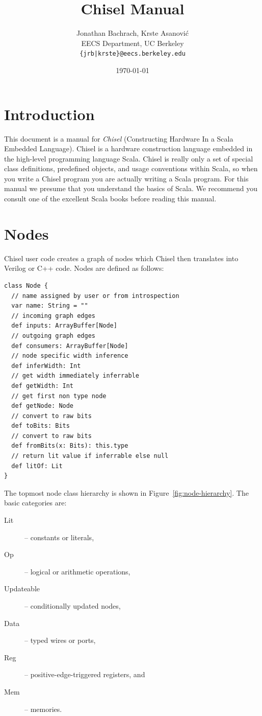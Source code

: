 \documentclass[10pt,twocolumn]{article}
\title{Chisel Manual}
\author{Jonathan Bachrach, Krste Asanovi\'{c} \\
EECS Department, UC Berkeley\\
{\tt  \{jrb|krste\}@eecs.berkeley.edu}
}
\date{\today}
\begin{document}
\maketitle{}




\section{Introduction}

This document is a manual for {\em Chisel} (Constructing
Hardware In a Scala Embedded Language).  Chisel is a hardware
construction language embedded in the high-level programming language
Scala.  Chisel is really only a set of special class
definitions, predefined objects, and usage conventions within Scala,
so when you write a Chisel program you are actually writing a Scala
program.  For this manual we presume that you
understand the basics of Scala.  
We recommend you consult one of the excellent
Scala books before reading this manual.

\section{Nodes}

Chisel user code creates a graph of nodes which Chisel then translates
into Verilog or C++ code.  Nodes are defined as follows:

\begin{lstlisting}
class Node {
  // name assigned by user or from introspection
  var name: String = ""
  // incoming graph edges
  def inputs: ArrayBuffer[Node]
  // outgoing graph edges
  def consumers: ArrayBuffer[Node]
  // node specific width inference
  def inferWidth: Int
  // get width immediately inferrable
  def getWidth: Int
  // get first non type node
  def getNode: Node
  // convert to raw bits 
  def toBits: Bits
  // convert to raw bits 
  def fromBits(x: Bits): this.type
  // return lit value if inferrable else null
  def litOf: Lit
}
\end{lstlisting}


The topmost node class hierarchy is shown in
Figure~\ref{fig:node-hierarchy}.  The basic categories are:

\begin{description}
\item[Lit] -- constants or literals,
\item[Op] -- logical or arithmetic operations,
\item[Updateable] -- conditionally updated nodes,
\item[Data] -- typed wires or ports,
\item[Reg] -- positive-edge-triggered registers, and
\item[Mem] -- memories.
\end{description}
\end{document}
